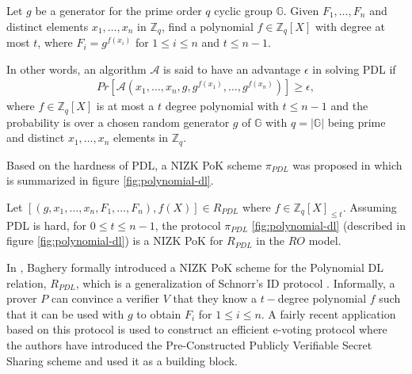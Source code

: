 \begin{definition}
  Let $g$ be a generator for the prime order $q$ cyclic group $\mathbb{G}$. Given $F_1,\dots,F_n$ and distinct elements $x_1,\dots,x_n$ in 
  $\mathbb{Z}_q$, find a polynomial $f\in\mathbb{Z}_q[X]$ with degree at most $t$, where $F_i=g^{f(x_i)}$ 
  for $1\leq i\leq n$ and $t\leq n-1$.\par

  In other words, an algorithm $\mathcal{A}$ is said to have an advantage $\epsilon$ in solving PDL if 
  \begin{align*}
    Pr[\mathcal{A}(x_1,\dots,x_n,g,g^{f(x_1)},\dots,g^{f(x_n)})]\geq\epsilon,
  \end{align*}
  where $f\in\mathbb{Z}_q[X]$ is at most a $t$ degree polynomial with $t\leq n-1$ and the probability is over a 
  chosen random generator $g$ of $\mathbb{G}$ with $q=|\mathbb{G}|$ being prime and distinct $x_1,\dots,x_n$ 
  elements in $\mathbb{Z}_q$.
\end{definition}

Based on the hardness of PDL, a NIZK PoK scheme $\pi_{PDL}$ was proposed in \cite{cryptoeprint:2023/1669} which is 
summarized in figure \ref{fig:polynomial-dl}.



\begin{theorem}\cite{cryptoeprint:2023/1669}\label{th:PDL security}
  Let $[(g,x_1,\dots,x_n,F_1,\dots,F_n),f(X)]\in R_{PDL}$ where $f\in\mathbb{Z}_q[X]_{\leq t}$. 
  Assuming PDL is hard, for $0\leq t\leq n-1$, the protocol $\pi_{PDL}$ \ref{fig:polynomial-dl} (described in figure \ref{fig:polynomial-dl}) 
  is a NIZK PoK for $R_{PDL}$ in the $RO$ model.
\end{theorem}

In \cite{cryptoeprint:2023/1669}, Baghery formally introduced a NIZK PoK scheme for the Polynomial DL 
relation, $R_{PDL}$, which is a generalization of Schnorr's ID protocol \cite{crypto-1989-1727}. Informally, 
a prover $P$ can convince a verifier $V$ that they know a $t-$degree polynomial $f$ such that 
it can be used with $g$ to obtain $F_i$ for $1\leq i\leq n$. A fairly recent application based on 
this protocol is used to construct an efficient e-voting protocol \cite{cryptoeprint:2025/576} where 
the authors have introduced the Pre-Constructed Publicly Verifiable Secret Sharing scheme and used it as a 
building block.

